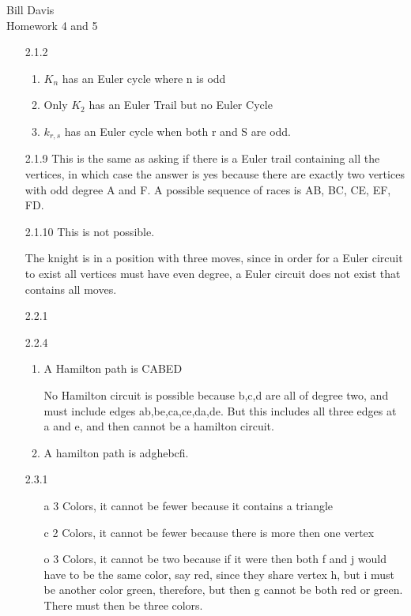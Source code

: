 \documentclass{article}
\begin{document}
Bill Davis\\
Homework 4 and 5

\begin{enumerate}

\item[2.1.2]
\begin{enumerate}
\item 
$K_n$ has an Euler cycle where n is odd
\item
Only $K_2$ has an Euler Trail but no Euler Cycle
\item 
$k_{r,s}$ has an Euler cycle when both r and S are odd. 
\end{enumerate}
\item[2.1.9]
This is the same as asking if there is a Euler trail containing all the vertices, in which case the answer is yes because there are exactly two vertices with odd degree A and F. A possible sequence of races is AB, BC, CE, EF, FD. 
\item[2.1.10]
This is not possible. 

              \newgame

              \showboard
The knight is in a position with three moves, since in order for a Euler circuit to exist all vertices must have even degree, a Euler circuit does not exist that contains all moves. 
\item[2.2.1]
\vspace{20 mm}
\item[2.2.4]
\begin{enumerate}
\item
A Hamilton path is CABED

No Hamilton circuit is possible because b,c,d are all of degree two, and must include edges ab,be,ca,ce,da,de. But this includes all three edges at a and e, and then cannot be a hamilton circuit. 
\item
A hamilton path is adghebcfi. 
\end{enumerate}

\item[2.3.1]
\begin{enumerate}
\item[a]
3 Colors, it cannot be fewer because it contains a triangle
\item[c]
2 Colors, it cannot be fewer because there is more then one vertex
\item[o]
3 Colors, it cannot be two because if it were then both f and j would have to be the same color, say red, since they share vertex h, but i must be another color green, therefore, but then g cannot be both red or green. There must then be three colors. 
\end{enumerate}


\end{enumerate}
\end{document}

